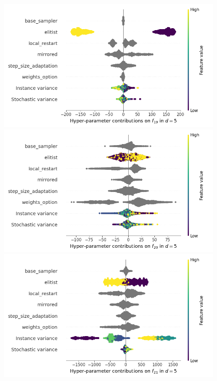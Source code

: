 \begin{figure}[t]
	\includegraphics[height=0.15\textheight,trim=60mm 0mm 30mm 0mm,clip]{images/img_summary_f19_d5.png}
	\includegraphics[height=0.15\textheight,trim=60mm 0mm 0mm 0mm,clip]{images/img_summary_f20_d5.png}
	\includegraphics[height=0.15\textheight,trim=0mm 0mm 30mm 0mm,clip]{images/img_summary_f21_d5.png}

\end{figure}
